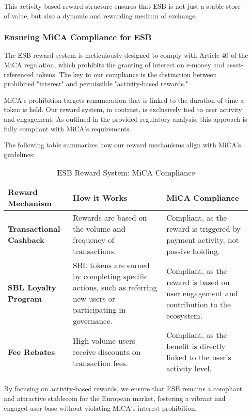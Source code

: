 This activity-based reward structure ensures that ESB is not just a stable store of value, but also a dynamic and rewarding medium of exchange.

\subsubsection{Ensuring MiCA Compliance for ESB}
The ESB reward system is meticulously designed to comply with Article 40 of the MiCA regulation, which prohibits the granting of interest on e-money and asset-referenced tokens. The key to our compliance is the distinction between prohibited "interest" and permissible "activity-based rewards."

MiCA's prohibition targets remuneration that is linked to the duration of time a token is held. Our reward system, in contrast, is exclusively tied to user activity and engagement. As outlined in the provided regulatory analysis, this approach is fully compliant with MiCA's requirements.

The following table summarizes how our reward mechanisms align with MiCA's guidelines:

\begin{table}[h!]
\centering
\renewcommand{\arraystretch}{1.2}
\begin{tabular}{|l|p{6cm}|p{6cm}|}
\hline
\textbf{Reward Mechanism} & \textbf{How it Works} & \textbf{MiCA Compliance} \\
\hline
\textbf{Transactional Cashback} & Rewards are based on the volume and frequency of transactions. & Compliant, as the reward is triggered by payment activity, not passive holding. \\
\hline
\textbf{SBL Loyalty Program} & SBL tokens are earned by completing specific actions, such as referring new users or participating in governance. & Compliant, as the reward is based on user engagement and contribution to the ecosystem. \\
\hline
\textbf{Fee Rebates} & High-volume users receive discounts on transaction fees. & Compliant, as the benefit is directly linked to the user's activity level. \\
\hline
\end{tabular}
\caption{ESB Reward System: MiCA Compliance}
\label{tab:micacompliance}
\end{table}

By focusing on activity-based rewards, we ensure that ESB remains a compliant and attractive stablecoin for the European market, fostering a vibrant and engaged user base without violating MiCA's interest prohibition.

